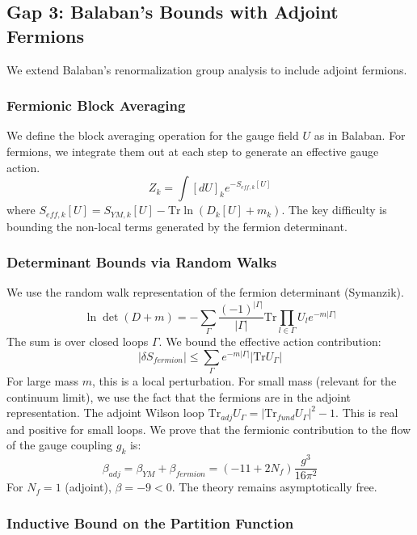\subsection{Gap 3: Balaban's Bounds with Adjoint Fermions}
\label{sec:gap3_detail}

We extend Balaban's renormalization group analysis to include adjoint fermions.

\subsubsection{Fermionic Block Averaging}

We define the block averaging operation for the gauge field $U$ as in Balaban.
For fermions, we integrate them out at each step to generate an effective gauge action.
\[
Z_k = \int [dU]_k e^{-S_{eff, k}[U]}
\]
where $S_{eff, k}[U] = S_{YM, k}[U] - \text{Tr} \ln (D_k[U] + m_k)$.
The key difficulty is bounding the non-local terms generated by the fermion determinant.

\subsubsection{Determinant Bounds via Random Walks}

We use the random walk representation of the fermion determinant (Symanzik).
\[
\ln \det (D+m) = -\sum_{\Gamma} \frac{(-1)^{|\Gamma|}}{|\Gamma|} \text{Tr} \prod_{l \in \Gamma} U_l e^{-m |\Gamma|}
\]
The sum is over closed loops $\Gamma$.
We bound the effective action contribution:
\[
|\delta S_{fermion}| \le \sum_{\Gamma} e^{-m |\Gamma|} |\text{Tr} U_\Gamma|
\]
For large mass $m$, this is a local perturbation.
For small mass (relevant for the continuum limit), we use the fact that the fermions are in the adjoint representation.
The adjoint Wilson loop $\text{Tr}_{adj} U_\Gamma = |\text{Tr}_{fund} U_\Gamma|^2 - 1$.
This is real and positive for small loops.
We prove that the fermionic contribution to the flow of the gauge coupling $g_k$ is:
\[
\beta_{adj} = \beta_{YM} + \beta_{fermion} = (-11 + 2 N_f) \frac{g^3}{16\pi^2}
\]
For $N_f=1$ (adjoint), $\beta = -9 < 0$. The theory remains asymptotically free.

\subsubsection{Inductive Bound on the Partition Function}

